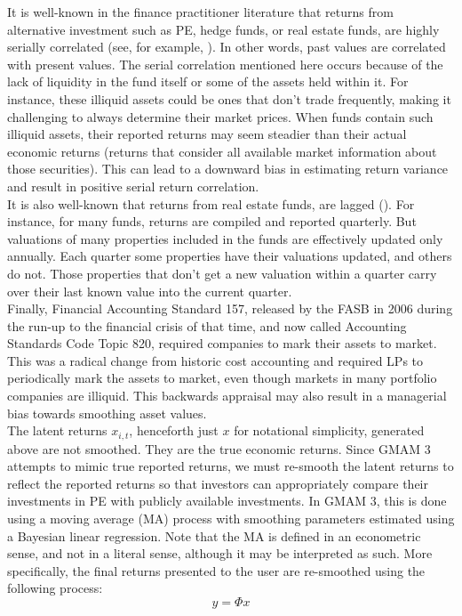 \documentclass[11pt]{article}
\begin{document}
It is well-known in the finance practitioner literature that returns from alternative investment such as PE, hedge funds, or real estate funds, are highly serially correlated (see, for example, \cite{getmansky_etal}). In other words, past values are correlated with present values. The serial correlation mentioned here occurs because of the lack of liquidity in the fund itself or some of the assets held within it. For instance, these illiquid assets could be ones that don't trade frequently, making it challenging to always determine their market prices. When funds contain such illiquid assets, their reported returns may seem steadier than their actual economic returns (returns that consider all available market information about those securities). This can lead to a downward bias in estimating return variance and result in positive serial return correlation. \\

It is also well-known that returns from real estate funds, are lagged (\cite{geltner1993}). For instance, for many funds, returns are compiled and reported quarterly. But valuations of many properties included in the funds are effectively updated only annually. Each quarter some properties have their valuations updated, and others do not. Those properties that don't get a new valuation within a quarter carry over their last known value into the current quarter. \\

Finally, Financial Accounting Standard 157, released by the FASB in 2006 during the run-up to the financial crisis of that time, and now called Accounting Standards Code Topic 820, required companies to mark their assets to market. This was a radical change from historic cost accounting and required LPs to periodically mark the assets to market, even though markets in many portfolio companies are illiquid. This backwards appraisal may also result in a managerial bias towards smoothing asset values. \\

The latent returns $x_{i,t}$, henceforth just $x$ for notational simplicity, generated above are not smoothed. They are the true economic returns. Since GMAM 3 attempts to mimic true reported returns, we must re-smooth the latent returns to reflect the reported returns so that investors can appropriately compare their investments in PE with publicly available investments. In GMAM 3, this is done using a moving average (MA) process with smoothing parameters estimated using a Bayesian linear regression. Note that the MA is defined in an econometric sense, and not in a literal sense, although it may be interpreted as such. More specifically, the final returns presented to the user are re-smoothed using the following process:
\begin{equation}
\label{eq:y}
	y=\Phi x
\end{equation}
\end{document}
